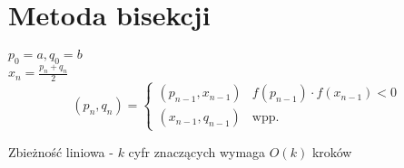 \section{Metoda bisekcji}
\begin{multicols}{2}
	\noindent
	\( p_0 = a, q_0 = b \) \\
	\( x_n = \frac{p_n + q_n}{2} \) \\
	\columnbreak
	\begin{equation*}
		(p_n, q_n) =
		\begin{cases}
			(p_{n-1}, x_{n-1}) & f(p_{n-1}) \cdot f(x_{n-1}) < 0 \\
			(x_{n-1}, q_{n-1}) & \text{wpp.}
		\end{cases}
	\end{equation*}
\end{multicols}
\noindent
Zbieżność liniowa - \( k \) cyfr znaczących wymaga \( O(k) \) kroków
